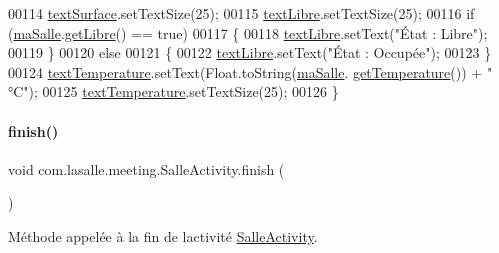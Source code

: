 \begin{DoxyCode}
00114         \hyperlink{classcom_1_1lasalle_1_1meeting_1_1_salle_activity_a0fb3dcfded70ba78d8ce46a507ff7ef2}{textSurface}.setTextSize(25);
00115         \hyperlink{classcom_1_1lasalle_1_1meeting_1_1_salle_activity_a3d80063be535c4f343498d1d0616092d}{textLibre}.setTextSize(25);
00116         \textcolor{keywordflow}{if} (\hyperlink{classcom_1_1lasalle_1_1meeting_1_1_salle_activity_a7ae6e92ee66fa15d999f166f40738648}{maSalle}.\hyperlink{classcom_1_1lasalle_1_1meeting_1_1_salle_adc0c4936355bc0ae22991f69c12a5e42}{getLibre}() == \textcolor{keyword}{true})
00117         \{
00118             \hyperlink{classcom_1_1lasalle_1_1meeting_1_1_salle_activity_a3d80063be535c4f343498d1d0616092d}{textLibre}.setText(\textcolor{stringliteral}{"État : Libre"});
00119         \}
00120         \textcolor{keywordflow}{else}
00121         \{
00122             \hyperlink{classcom_1_1lasalle_1_1meeting_1_1_salle_activity_a3d80063be535c4f343498d1d0616092d}{textLibre}.setText(\textcolor{stringliteral}{"État : Occupée"});
00123         \}
00124         \hyperlink{classcom_1_1lasalle_1_1meeting_1_1_salle_activity_a234ef25278aeb3164d379158fc294283}{textTemperature}.setText(Float.toString(\hyperlink{classcom_1_1lasalle_1_1meeting_1_1_salle_activity_a7ae6e92ee66fa15d999f166f40738648}{maSalle}.
      \hyperlink{classcom_1_1lasalle_1_1meeting_1_1_salle_ae3235f548f8bc7ab4d05ff38ec762e77}{getTemperature}()) + \textcolor{stringliteral}{" °C"});
00125         \hyperlink{classcom_1_1lasalle_1_1meeting_1_1_salle_activity_a234ef25278aeb3164d379158fc294283}{textTemperature}.setTextSize(25);
00126     \}
\end{DoxyCode}
\mbox{\label{classcom_1_1lasalle_1_1meeting_1_1_salle_activity_a26628d1f78ddcfaff36b33d354cd97b9}} 
\paragraph{\texorpdfstring{finish()}{finish()}}
{\footnotesize\ttfamily void com.\+lasalle.\+meeting.\+Salle\+Activity.\+finish (\begin{DoxyParamCaption}{ }\end{DoxyParamCaption})}



Méthode appelée à la fin de l\textquotesingle{}activité \hyperlink{classcom_1_1lasalle_1_1meeting_1_1_salle_activity}{Salle\+Activity}. 

